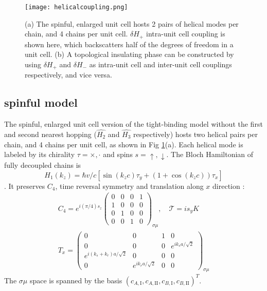 


\begin{figure}[htbp]
    \centering\texttt{[image: helicalcoupling.png]}
    \caption{(a) The spinful, enlarged unit cell hosts 2 pairs of helical modes per chain, and 4 chains per unit cell. $\delta H_{+}$ intra-unit cell coupling is shown here, which backscatters half of the degrees of freedom in a unit cell. (b) A topological insulating phase can be constructed by using $\delta H_+$ and $\delta H_-$ as intra-unit cell and inter-unit cell couplings respectively, and vice versa. }\label{fig:intra}
\end{figure}

\subsection{spinful model}
The spinful, enlarged unit cell version of the tight-binding model without the first and second nearest hopping ($\hat{H_2}$ and $\hat{H_3}$ respectively) hosts two helical pairs per chain, and 4 chains per unit cell, as shown in Fig \ref{fig:intra}(a). Each helical mode is labeled by its chirality $\tau=\times, \cdot$ and spins $s=\uparrow,\downarrow$. The Bloch Hamiltonian of fully decoupled chains is 
\begin{equation}\label{eq:H1}
    H_1(k_z)=\hbar v/c\left[\sin{(k_zc)}\tau_y +(1+\cos{(k_zc)})\tau_x\right]
\end{equation}
. It preserves $C_4$, time reversal symmetry and translation along $x$ direction :
\begin{equation}
\begin{split}
C_4=e^{i(\pi/4)s_z}\begin{pmatrix}
0 &0 &0&1\\
1&0&0&0\\
0&1&0&0\\
0&0&1&0
\end{pmatrix}_{\sigma\mu},\quad \mathcal{T}=is_yK\\
T_x=\begin{pmatrix}
0&0&1&0\\
0&0&0&e^{ik_sa/\sqrt{2}}\\
e^{i(k_s+k_r)a/\sqrt{2}} &0&0&0\\
0 & e^{ik_ra/\sqrt{2}} &0&0
\end{pmatrix}_{\sigma\mu}
\end{split}
\end{equation}
The $\sigma\mu$ space is spanned by the basis $(c_{A,\mathrm{I}},c_{A,\mathrm{II}},c_{B,\mathrm{I}},c_{B,\mathrm{II}})^T$. 

